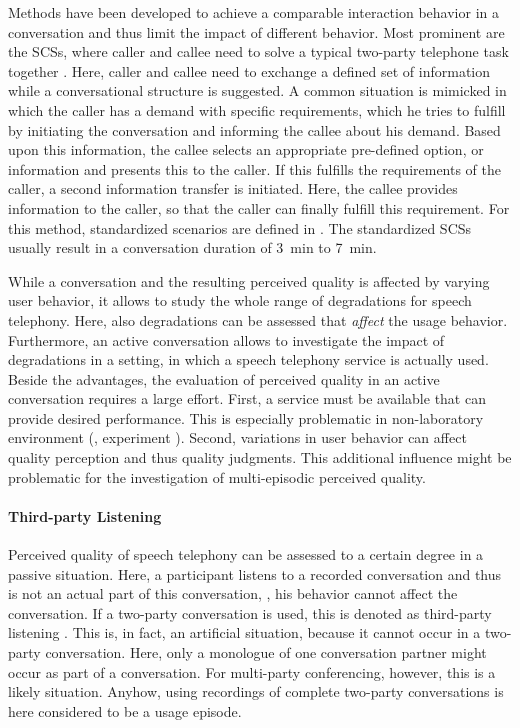 Methods have been developed to achieve a comparable interaction behavior in a conversation and thus limit the impact of different behavior.
Most prominent are the \acp{SCS}, where caller and callee need to solve a typical two-party telephone task together \citep[][p.~76]{moller_assessment_2000}.
Here, caller and callee need to exchange a defined set of information while a conversational structure is suggested.
A common situation is mimicked in which the caller has a demand with specific requirements, which he tries to fulfill by initiating the conversation and informing the callee about his demand.
Based upon this information, the callee selects an appropriate pre-defined option, or information and presents this to the caller.
If this fulfills the requirements of the caller, a second information transfer is initiated.
Here, the callee provides information to the caller, so that the caller can finally fulfill this requirement.
For this method, standardized scenarios are defined in \citet{itu-t_recommendation_p.805_subjective_2007}.
The standardized \acp{SCS} usually result in a conversation duration of 3~min to 7~min.

While a conversation and the resulting perceived quality is affected by varying user behavior, it allows to study the whole range of degradations for speech telephony.
Here, also degradations can be assessed that \emph{affect} the usage behavior. %
Furthermore, an active conversation allows to investigate the impact of degradations in a setting, in which a speech telephony service is actually used.
Beside the advantages, the evaluation of perceived quality in an active conversation requires a large effort.
First, a service must be available that can provide desired performance.
This is especially problematic in non-laboratory environment (\cf, experiment ).
Second, variations in user behavior can affect quality perception and thus quality judgments.
This additional influence might be problematic for the investigation of multi-episodic perceived quality.

\paragraph*{Third-party Listening}
Perceived quality of speech telephony can be assessed  to a certain degree in a passive situation.
Here, a participant listens to a recorded conversation and thus is not an actual part of this conversation, \ie, his behavior cannot affect the conversation.
If a two-party conversation is used, this is denoted as third-party listening \citep[][p.~13]{itu-t_recommendation_p.832_subjective_2000}.
This is, in fact, an artificial situation, because it cannot occur in a two-party conversation.
Here, only a monologue of one conversation partner might occur as part of a conversation.
For multi-party conferencing, however, this is a likely situation.
Anyhow, using recordings of complete two-party conversations is here considered to be a usage episode.

